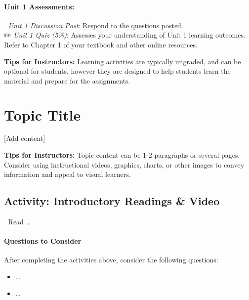 \documentclass[
]{book}
\providecommand{\tightlist}{%
  \setlength{\itemsep}{0pt}\setlength{\parskip}{0pt}}
\begin{document}
\begin{assessment}
\hypertarget{unit-1-assessments}{%
\paragraph{Unit 1 Assessments:}\label{unit-1-assessments}}

💬 \emph{Unit 1 Discussion Post}: Respond to the questions posted.\\
✏️ \emph{Unit 1 Quiz (5\%)}: Assesses your understanding of Unit 1
learning outcomes. Refer to Chapter 1 of your textbook and other online
resources.
\end{assessment}

\begin{feedback}
\textbf{Tips for Instructors:} Learning activities are typically
ungraded, and can be optional for students, however they are designed to
help students learn the material and prepare for the assignments.
\end{feedback}

\hypertarget{topic-title}{%
\section*{Topic Title}\label{topic-title}}

{[}Add content{]}

\begin{feedback}
\textbf{Tips for Instructors:} Topic content can be 1-2 paragraphs or
several pages. Consider using instructional videos, graphics, charts, or
other images to convey information and appeal to visual learners.
\end{feedback}

\hypertarget{activity-introductory-readings-video}{%
\subsection*{Activity: Introductory Readings \& Video}\label{activity-introductory-readings-video}}

\begin{reflect}
📗 Read \ldots{}

\hypertarget{questions-to-consider}{%
\paragraph*{Questions to Consider}\label{questions-to-consider}}

After completing the activities above, consider the following questions:

\begin{itemize}
\tightlist
\item
  \ldots{}\\
\item
  \ldots{}
\end{itemize}
\end{reflect}
\end{document}
